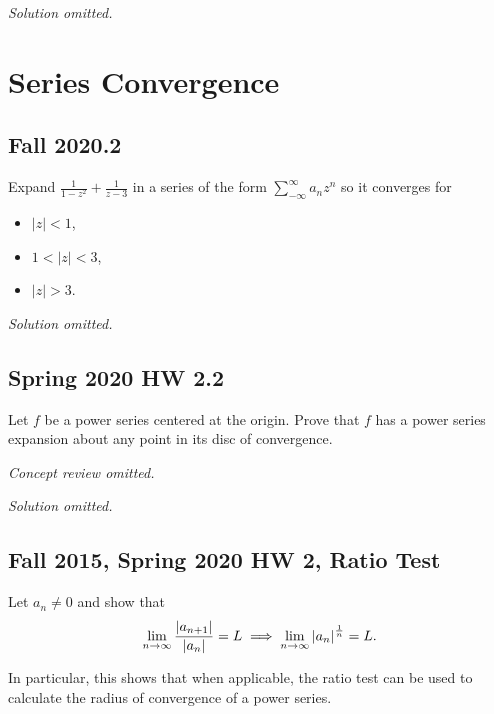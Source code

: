 \emph{Solution omitted.}

\hypertarget{series-convergence}{%
\section{Series Convergence}\label{series-convergence}}

\hypertarget{fall-2020.2}{%
\subsection{Fall 2020.2}\label{fall-2020.2}}

\begin{problem}[?]

Expand \(\frac{1}{1-z^{2}}+\frac{1}{z-3}\) in a series of the form
\(\sum_{-\infty}^{\infty} a_{n} z^{n}\) so it converges for

\begin{itemize}
\item
  \(|z|<1\),
\item
  \(1<|z|<3\),
\item
  \(|z|>3\).
\end{itemize}

\end{problem}

\emph{Solution omitted.}

\hypertarget{spring-2020-hw-2.2}{%
\subsection{Spring 2020 HW 2.2}\label{spring-2020-hw-2.2}}

\begin{problem}[?]

Let \(f\) be a power series centered at the origin. Prove that \(f\) has
a power series expansion about any point in its disc of convergence.

\end{problem}

\emph{Concept review omitted.}

\emph{Solution omitted.}

\hypertarget{fall-2015-spring-2020-hw-2-ratio-test}{%
\subsection{Fall 2015, Spring 2020 HW 2, Ratio
Test}\label{fall-2015-spring-2020-hw-2-ratio-test}}

\begin{problem}[?]

Let \(a_n\neq 0\) and show that
\begin{align*}
\lim_{n\to \infty} {{\left\lvert {a_{n+1}} \right\rvert} \over {\left\lvert {a_n} \right\rvert}} = L \implies \lim_{n\to\infty} {\left\lvert {a_n} \right\rvert}^{1\over n} = L
.\end{align*}

In particular, this shows that when applicable, the ratio test can be
used to calculate the radius of convergence of a power series.

\end{problem}

